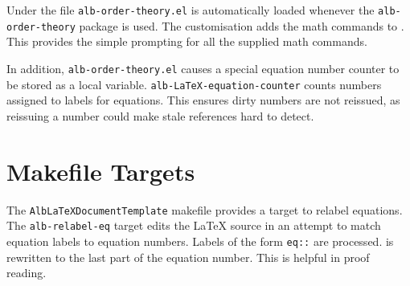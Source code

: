 \documentclass[11pt,a4paper,oneside]{alb-corp}
\begin{document}
Under \AUCTeX{} the file \texttt{alb-order-theory.el} is automatically
loaded whenever the \texttt{alb-order-theory} package is used.  The
customisation adds the math commands to \AUCTeX{}.  This provides the
simple prompting for all the supplied math commands.

In addition, \texttt{alb-order-theory.el} causes a special equation
number counter to be stored as a local variable.
\texttt{alb-LaTeX-equation-counter} counts numbers assigned to labels
for equations.  This ensures dirty numbers are not reissued, as
reissuing a number could make stale references hard to detect.




\section{Makefile Targets}
\label{sec:alb-order-theory-documentation:makef-targ}

The \texttt{AlbLaTeXDocumentTemplate} makefile provides a target to
relabel equations.  The \texttt{alb-relabel-eq} target edits the
\LaTeX{} source in an attempt to match equation labels to equation
numbers.  Labels of the form
\texttt{eq:}\texttt{:} are
processed.   is rewritten to the last part of the
equation number.  This is helpful in proof reading.
\end{document}
